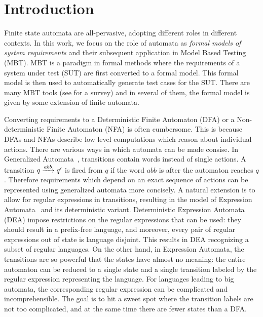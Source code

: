 \section{Introduction}


  Finite state automata are all-pervasive, adopting different roles in different contexts. In this work, we focus on the role of automata as \emph{formal models of system requirements} and their subsequent application in Model Based Testing (MBT). MBT is a paradigm in formal methods where the requirements of a system under test (SUT) are first converted to a formal model. This formal model is then used to automatically generate test cases for the SUT. There are many MBT tools (see \cite{10.1145/1353673.1353681,10.1002/stvr.456} for a survey) and in several of them, the formal model is given by some extension of finite automata. 


  Converting requirements to a Deterministic Finite Automaton (DFA) or a Non-deterministic Finite Automaton (NFA) is often cumbersome. This is because DFAs and NFAs describe low level computations which reason about individual actions. There are various ways in which automata can be made consise. In Generalized Automata~\cite{DBLP:books/lib/Eilenberg76,GIAMMARRESI1999191}, transitions contain words instead of single actions. A transition $q \xrightarrow{abb} q'$ is fired from $q$ if the word $abb$ is after the automaton reaches $q$. Therefore requirements which depend on an exact sequence of actions can be represented using generalized automata more concisely. A natural extension is to allow for regular expressions in transitions, resulting in the model of Expression Automata~\cite{10.1007/978-3-540-30500-2_15} and its deterministic variant. Deterministic Expression Automata (DEA) impose restrictions on the regular expressions that can be used: they should result in a prefix-free language, and moreover, every pair of regular expressions out of state is language disjoint. This results in DEA recognizing a subset of regular languages. On the other hand, in Expression Automata, the transitions are so powerful that the states have almost no meaning: the entire automaton can be reduced to a single state and a single transition labeled by the regular expression representing the language. For languages leading to big automata, the corresponding regular expression can be complicated and incomprehensible. The goal is to hit a sweet spot where the transition labels are not too complicated, and at the same time there are fewer states than a DFA. 

